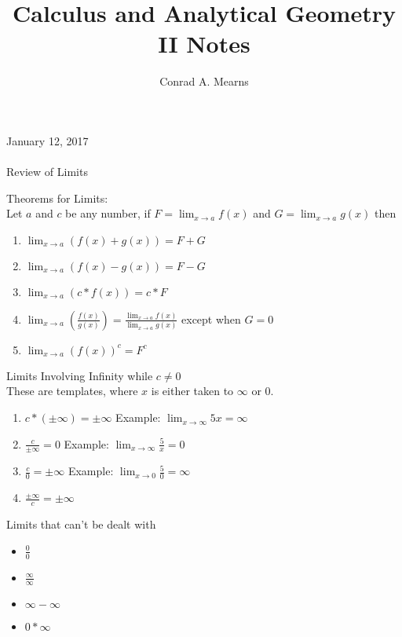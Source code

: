 \documentclass{article}
\title{Calculus and Analytical Geometry II Notes}
\author{Conrad A. Mearns}
\begin{document}
\maketitle

\noindent
\Large
January 12, 2017\\\\
Review of Limits\\
\normalsize

\noindent
Theorems for Limits:\\
Let $a$ and $c$ be any number, if $F = \lim_{x \to a}f(x)$ and $G = \lim_{x \to a}g(x)$ then

\begin{enumerate}
  \item $\lim_{x \to a}(f(x) + g(x)) = F + G$
  \item $\lim_{x \to a}(f(x) - g(x)) = F - G$
  \item $\lim_{x \to a}(c * f(x)) = c * F$
  \item $\lim_{x \to a}(\frac{f(x)}{g(x)}) = \frac{\lim_{x \to a}f(x)}{\lim_{x \to a}g(x)}$ except when $G = 0$
  \item $\lim_{x \to a}(f(x))^c = F^c$
\end{enumerate}

\noindent
\Large
Limits Involving Infinity while $c \neq 0$\\
\normalsize
\noindent
These are templates, where $x$ is either taken to $\infty$ or 0.

\begin{enumerate}
  \item $c * (\pm \infty) = \pm \infty$ Example: $\lim_{x \to \infty}5x = \infty$
  \item $\frac{c}{\pm \infty} = 0$ Example: $\lim_{x \to \infty}\frac{5}{x} = 0$
  \item $\frac{c}{0} = \pm \infty$ Example: $\lim_{x \to 0}\frac{5}{0} = \infty$
  \item $\frac{\pm \infty}{c} = \pm \infty$
\end{enumerate}

\noindent
\Large
Limits that can't be dealt with
\normalsize
\noindent
\begin{itemize}
  \item $\frac{0}{0}$
  \item $\frac{\infty}{\infty}$
  \item $\infty - \infty$
  \item $0 * \infty$
\end{itemize}
\end{document}
